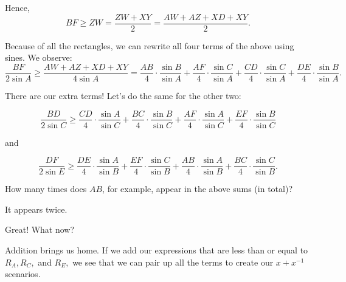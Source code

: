 Hence, $$BF \geq ZW = \frac{ZW + XY}{2} = \frac{AW+AZ+XD+XY}{2}.$$

Because of all the rectangles, we can rewrite all four terms of the above using sines. We observe: $$\frac{BF}{2 \sin A}\ge \frac{AW+AZ+XD+XY}{4 \sin A} =\frac{AB}{4}\cdot \frac{\sin B}{\sin A} + \frac{AF}{4}\cdot\frac{\sin C}{\sin A} + \frac{CD}{4}\cdot \frac{\sin C}{\sin A} + \frac{DE}{4}\cdot \frac{\sin B}{\sin A}.$$

There are our extra terms!  Let's do the same for the other two: 


$$\frac{BD}{2 \sin C} \geq \frac{CD}{4} \cdot \frac{\sin A}{\sin C} + \frac{BC}{4} \cdot \frac{\sin B}{\sin C} + \frac{AF}{4} \cdot \frac{\sin A}{\sin C} + \frac{EF}{4} \cdot \frac{\sin B}{\sin C}$$


    and


$$\frac{DF}{2 \sin E} \geq \frac{DE}{4} \cdot \frac{\sin A}{\sin B} + \frac{EF}{4} \cdot \frac{\sin C}{\sin B} + \frac{AB}{4} \cdot \frac{\sin A}{\sin B} + \frac{BC}{4} \cdot \frac{\sin C}{\sin B}.$$

How many times does $AB$, for example, appear in the above sums (in total)?









It appears twice.

Great! What now?


Addition brings us home.  If we add our expressions that are less than or equal to $R_A, R_C,$ and $R_E,$ we see that we can pair up all the terms to create our $x + x^{-1}$ scenarios.

